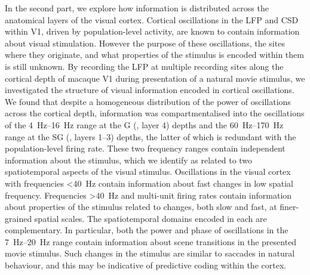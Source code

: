 In the second part, we explore how information is distributed across the anatomical layers of the visual cortex.
Cortical oscillations in the \acf{LFP} and \acf{CSD} within \acs{V1}, driven by population-level activity, are known to contain information about visual stimulation.
However the purpose of these oscillations, the sites where they originate, and what properties of the stimulus is encoded within them is still unknown.
By recording the \ac{LFP} at multiple recording sites along the cortical depth of macaque \acs{V1} during presentation of a natural movie stimulus, we investigated the structure of visual information encoded in cortical oscillations.
We found that despite a homogeneous distribution of the power of oscillations across the cortical depth, information was compartmentalised into the oscillations of the \SIrange{4}{16}{Hz} range at the \acl{G} (, layer 4) depths and the \SIrange{60}{170}{Hz} range at the \acl{SG} (, layers 1--3) depths, the latter of which is redundant with the population-level firing rate.
These two frequency ranges contain independent information about the stimulus, which we identify as related to two spatiotemporal aspects of the visual stimulus.
Oscillations in the visual cortex with frequencies \SI{<40}{Hz} contain information about fast changes in low spatial frequency.
Frequencies \SI{>40}{Hz} and multi-unit firing rates contain information about properties of the stimulus related to changes, both slow and fast, at finer-grained spatial scales.
The spatiotemporal domains encoded in each are complementary.
In particular, both the power and phase of oscillations in the \SIrange{7}{20}{Hz} range contain information about scene transitions in the presented movie stimulus.
Such changes in the stimulus are similar to saccades in natural behaviour, and this may be indicative of predictive coding within the cortex.


\endgroup			

